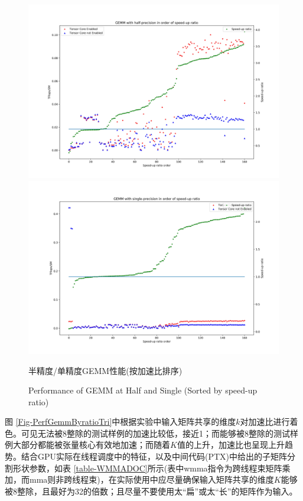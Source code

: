 \begin{figure}
	\centering
	\includegraphics[width=15cm]{figures/GEMM-Half-TF-Byratio.jpg}\\
	\includegraphics[width=15cm]{figures/GEMM-Single-TF-Byratio.jpg}
	\renewcommand{\thefigure}{\arabic{section}-\arabic{figure} }
	\renewcommand{\figurename}{图}
	\caption{半精度/单精度GEMM性能(按加速比排序)}
	\addtocounter{figure}{-1}
	\renewcommand{\thefigure}{\arabic{section}-\arabic{figure} }
	\renewcommand{\figurename}{Figure}
	\caption{Performance of GEMM at Half and Single (Sorted by speed-up ratio)}
	\label{Fig-PerfGemmByratio}
\end{figure}
\par 图 \ref{Fig-PerfGemmByratioTri}中根据实验中输入矩阵共享的维度$ k $对加速比进行着色。可见无法被8整除的测试样例的加速比较低，接近1；而能够被8整除的测试样例大部分都能被张量核心有效地加速；而随着$ K $值的上升，加速比也呈现上升趋势。结合GPU实际在线程调度中的特征，以及中间代码(PTX)中给出的子矩阵分割形状参数，如表 \ref{table-WMMADOC}所示(表中wmma指令为跨线程束矩阵乘加，而mma则非跨线程束)，在实际使用中应尽量确保输入矩阵共享的维度$ K $能够被8整除，且最好为32的倍数；且尽量不要使用太“扁”或太“长”的矩阵作为输入。
